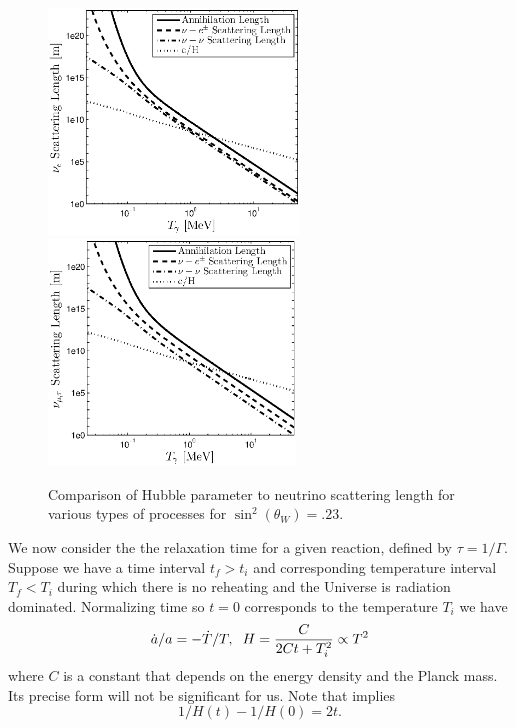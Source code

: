 \begin{figure}[ht]
\centerline{\includegraphics[height=6cm]{03-birrell/ParametricStudies/nu_e_scattering_length_eta_0_23.eps}\includegraphics[height=6cm]{03-birrell/ParametricStudies/nu_mu_scattering_length_eta_0_23.eps}}
\caption{Comparison of Hubble parameter to neutrino scattering length for various types of processes for $\sin^2(\theta_W)=.23$. }\label{fig:scatt_length}
\end{figure}


We now consider the the relaxation time for a given reaction, defined by $\tau=1/\Gamma$.  Suppose we have a time interval $t_f>t_i$  and corresponding temperature interval $T_f<T_i$ during which there is no reheating and the Universe is radiation dominated.  Normalizing time so $t=0$ corresponds to the temperature $T_i$ we have
\begin{equation}\label{ch6:H_eq}
\dot a/a=-\dot T/T,\hspace{2mm} H=\frac{C}{2Ct+T_i^2}\propto T^2
\end{equation}
where $C$ is a constant that depends on the energy density and the Planck mass.  Its precise form will not be significant for us.  Note that  implies
\begin{equation}
1/H(t)-1/H(0)=2t.
\end{equation}

